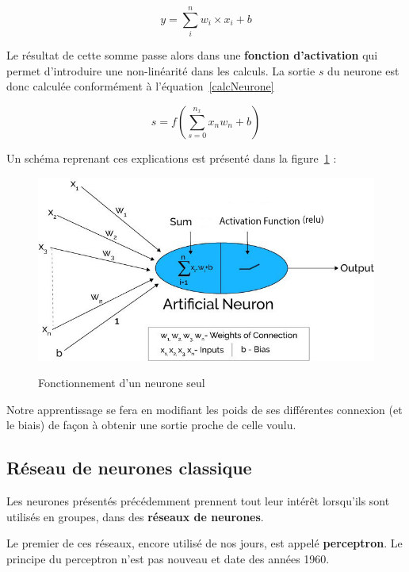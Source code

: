 \begin{equation}
\label{sommePonderee}
y = \sum_{i}^{n} w_i \times x_i + b
\end{equation}

Le résultat de cette somme passe alors dans une \textbf{fonction d'activation} qui permet d'introduire une non-linéarité dans les calculs. La sortie $s$ du neurone est donc calculée conformément à l'équation~\ref{calcNeurone}

\begin{equation}
\label{calcNeurone}
s = f(\sum_{s=0}^{n_{x}} x_{n}w_{n} + b)
\end{equation}

Un schéma reprenant ces explications est présenté dans la figure~\ref{neuroneSeul} :

\begin{figure}[h]
\includegraphics[width=16.5cm]{./images/image2.jpg}
\label{neuroneSeul}
\caption{Fonctionnement d'un neurone seul}
\end{figure}

Notre apprentissage se fera en modifiant les poids de ses différentes
connexion (et le biais) de façon à obtenir une sortie proche de celle voulu.\newline

\hypertarget{Ruxe9seau-de-neurones-classique}{%
\subsection{Réseau de neurones classique}
\label{Ruxe9seau-de-neurones-classique}}

Les neurones présentés précédemment prennent tout leur intérêt lorsqu'ils sont utilisés en groupes, dans des \textbf{réseaux de neurones}.

Le premier de ces réseaux, encore utilisé de nos jours, est appelé \textbf{perceptron}.
Le principe du perceptron n'est pas nouveau et date des années 1960.

